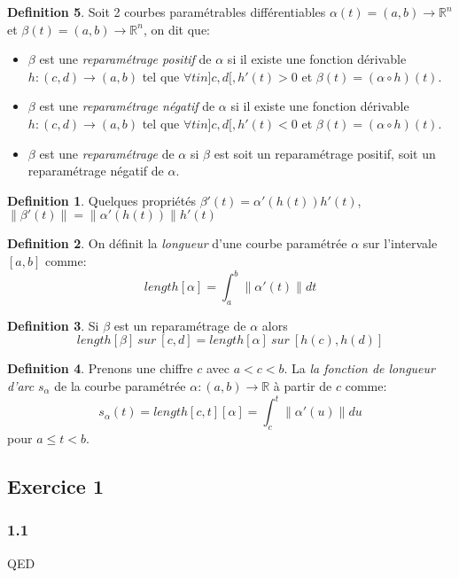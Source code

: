 \documentclass[]{book}
\theoremstyle{definition}
\newtheorem{defn}{Definition}
\newcommand{\bb}[1]{\mathbb{#1}}
\newcommand{\R}{\bb{R}}
\begin{document}
\begin{defn}
Soit 2 courbes param\'etrables diff\'erentiables $\alpha(t) = (a,b) \to \R^n$ et $\beta(t) = (a,b) \to \R^n$, on dit que:
\begin{itemize}
\item $\beta$ est une \emph{reparam\'etrage positif} de $\alpha$ si il existe une fonction d\'erivable $h: (c,d) \to (a,b)$ tel que $\forall t in ]c,d[, h'(t) > 0$ et $\beta(t) = (\alpha \circ h)(t)$. 
\item $\beta$ est une \emph{reparam\'etrage n\'egatif} de $\alpha$ si il existe une fonction d\'erivable $h: (c,d) \to (a,b)$ tel que $\forall t in ]c,d[, h'(t) < 0$ et $\beta(t) = (\alpha \circ h)(t)$. 
\item $\beta$ est une \emph{reparam\'etrage} de $\alpha$ si $\beta$ est soit un reparam\'etrage positif, soit un reparam\'etrage n\'egatif de $\alpha$. 
\end{itemize}

 
\begin{defn}
Quelques propri\'et\'es $\beta'(t) = \alpha'(h(t))h'(t)$, $\lVert \beta'(t)\rVert = \lVert\alpha'(h(t))\rVert h'(t)$
\end{defn}
 

\begin{defn}
On d\'efinit la \emph{longueur} d'une courbe param\'etr\'ee $\alpha$ sur l'intervale $[a,b]$ comme:
$$length[\alpha] = \int_a^b \lVert \alpha'(t)\rVert dt$$
\end{defn}

\begin{defn}
Si $\beta$ est un reparam\'etrage de $\alpha$ alors
$$length[\beta] \ sur\ [c,d] = length[\alpha]  \ sur\ [h(c),h(d)]$$ 
\end{defn}
 

\begin{defn}
Prenons une chiffre $c$ avec $a < c < b$. La \emph{la fonction de longueur d'arc} $s_{\alpha}$ de la courbe param\'etr\'ee $\alpha:(a,b) \to \R$ \`a partir de $c$ comme:
$$
s_{\alpha}(t) = length[c,t][\alpha] = \int_c^t \lVert \alpha'(u) \rVert du
$$ 
pour $a \le t < b$.
\end{defn}
 

 
\end{defn}



\subsection*{Exercice 1}

\subsubsection*{1.1}


QED
\end{document}
